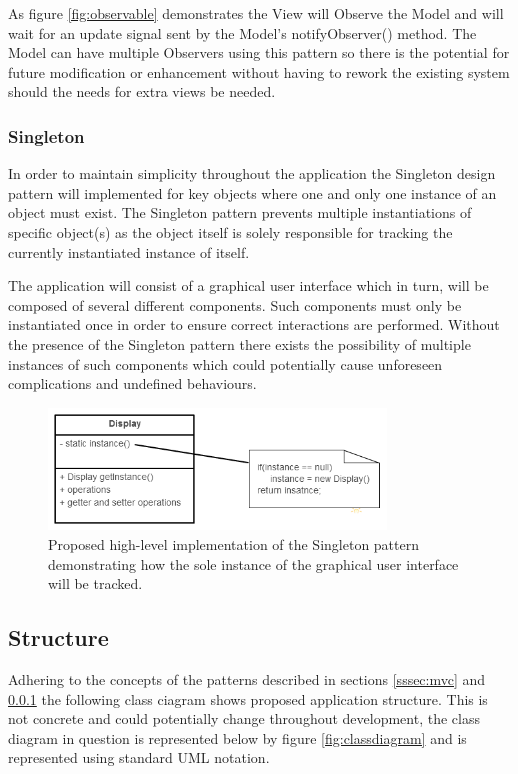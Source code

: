 \noindent
As figure \ref{fig:observable} demonstrates the View will Observe the Model and will wait for an update signal sent by the Model's notifyObserver() method. The Model can have multiple Observers using this pattern so there is the potential for future modification or enhancement without having to rework the existing system should the needs for extra views be needed.

\subsubsection{Singleton}
\label{sssec:singleton}
In order to maintain simplicity throughout the application the Singleton design pattern will implemented for key objects where one and only one instance of an object must exist. The Singleton pattern prevents multiple instantiations of specific object(s) as the object itself is solely responsible for tracking the currently instantiated instance of itself\cite{gof:design:singleton}. 

The application will consist of a graphical user interface which in turn, will be composed of several different components. Such components must only be instantiated once in order to ensure correct interactions are performed. Without the presence of the Singleton pattern there exists the possibility of multiple instances of such components which could potentially cause unforeseen complications and undefined behaviours.

\begin{figure}[H]
\centering
\label{fig:singleton}
\includegraphics[width=0.8\textwidth]{Images/design/signleton}
\caption[Singleton Implementation]{Proposed high-level implementation of the Singleton pattern demonstrating how the sole instance of the graphical user interface will be tracked.}
\end{figure}

\subsection{Structure}
Adhering to the concepts of the patterns described in sections \ref{sssec:mvc} and \ref{sssec:singleton} the following class ciagram shows proposed application structure. This is not concrete and could potentially change throughout development, the class diagram in question is represented below by figure \ref{fig:classdiagram} and is represented using standard UML notation.

